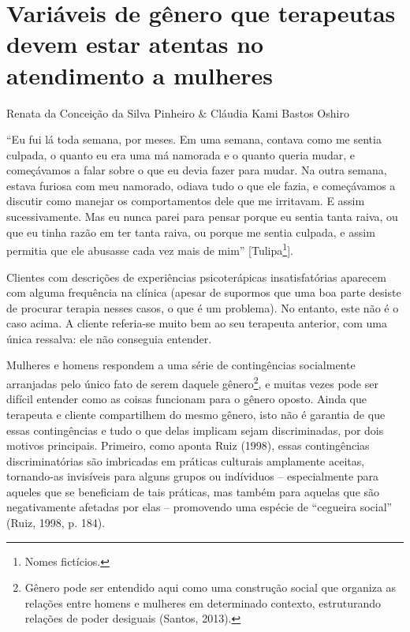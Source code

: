 \chapter{Variáveis de gênero que terapeutas devem estar atentas no atendimento a mulheres}
\begin{flushright}
\begin{scriptsize}
Renata da Conceição da Silva Pinheiro \& Cláudia Kami Bastos Oshiro
\end{scriptsize}
\vspace{1cm}
\end{flushright}

``Eu fui lá toda semana, por meses. Em uma semana, contava como me sentia culpada, o quanto eu era uma má namorada e o quanto queria mudar, e começávamos a falar sobre o que eu devia fazer para mudar. Na outra semana, estava furiosa com meu namorado, odiava tudo o que ele fazia, e começávamos a discutir como manejar os comportamentos dele que me irritavam. E assim sucessivamente. Mas eu nunca parei para pensar porque eu sentia tanta raiva, ou que eu tinha razão em ter tanta raiva, ou porque me sentia culpada, e assim permitia que ele abusasse cada vez mais de mim'' [Tulipa\footnote{Nomes fictícios.}].

Clientes com descrições de experiências psicoterápicas insatisfatórias aparecem com alguma frequência na clínica (apesar de supormos que uma boa parte desiste de procurar terapia nesses casos, o que é um problema). No entanto, este não é o caso acima. A cliente referia-se muito bem ao seu terapeuta anterior, com uma única ressalva: ele não conseguia entender. 

Mulheres e homens respondem a uma série de contingências socialmente arranjadas pelo único fato de serem daquele gênero\footnote{Gênero pode ser entendido aqui como uma construção social que organiza as relações entre homens e mulheres em determinado contexto, estruturando relações de poder desiguais (Santos, 2013).}, e muitas vezes pode ser difícil entender como as coisas funcionam para o gênero oposto. Ainda que terapeuta e cliente compartilhem do mesmo gênero, isto não é garantia de que essas contingências e tudo o que delas implicam sejam discriminadas, por dois motivos principais. Primeiro, como aponta Ruiz (1998), essas contingências discriminatórias são imbricadas em práticas culturais amplamente aceitas, tornando-as invisíveis para alguns grupos ou indíviduos – especialmente para aqueles que se beneficiam de tais práticas, mas também para aquelas que são negativamente afetadas por elas – promovendo uma espécie de ``cegueira social'' (Ruiz, 1998, p. 184).

